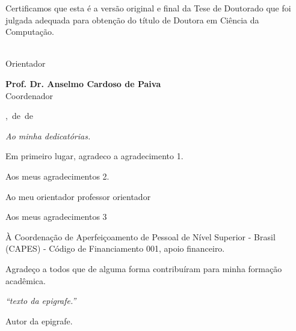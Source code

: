 \documentclass[
	12pt,				%
	oneside,			%
	a4paper,			%
	english,			%
	french,				%
	spanish,			%
	brazil				%
	]{abntex2}
\newcommand{\alinhadoesq}[1]{\noindent\begin{minipage}[top]{\textwidth}#1\end{minipage}}
\newcommand{\alinhadodir}[1]{\alinhadoesq{\begin{flushright}#1\end{flushright}}}
\newcommand{\myyear}{}
\newcommand{\mymonth}{}
\newcommand{\myday}{}
\begin{document}
\begin{folhadeaprovacao}
\hspace{.15\textwidth}
\begin{minipage}{.75\textwidth}
   Certificamos que esta é a versão original e final da Tese de Doutorado  que foi julgada adequada para obtenção do título de Doutora em Ciência da Computação.
\end{minipage} 

\vspace*{\fill} 

\alinhadodir{ \textbf{\imprimirorientador} \\ Orientador }
\vspace*{\fill} 

\alinhadodir{\textbf{Prof. Dr. Anselmo Cardoso de Paiva} \\ Coordenador }

\vspace*{\fill} 

\alinhadodir{\imprimirlocal, \myday\,de \mymonth\,de \myyear}
      
\end{folhadeaprovacao}



\begin{dedicatoria}
  \vspace*{\fill}
  \begin{flushright}
        \textit{Ao minha dedicatórias.}
  \end{flushright}
  \vspace{2,5cm}
\end{dedicatoria}%



\begin{agradecimentos}
Em primeiro lugar, agradeco a agradecimento 1.

Aos meus agradecimentos 2.

Ao meu orientador professor orientador 


Aos meus agradecimentos 3

À Coordenação de Aperfeiçoamento de Pessoal de Nível Superior - Brasil (CAPES) - Código de Financiamento 001,  apoio financeiro.

Agradeço a todos que de alguma forma contribuíram para minha formação acadêmica.


\end{agradecimentos}

\newpage
\begin{epigrafe}
   \vspace*{\fill}
	\begin{flushright}
		\textit{“texto da epigrafe.”}

    Autor da epigrafe.
	\end{flushright}
	\vspace{2,5cm}
\end{epigrafe}
\end{document}
